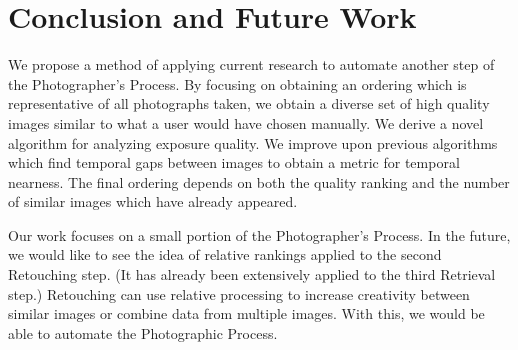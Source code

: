 \documentclass{article}
\begin{document}

\section{Conclusion and Future Work}
We propose a method of applying current research to automate another step of the Photographer's Process. By focusing on obtaining an ordering which is representative of all photographs taken, we obtain a diverse set of high quality images similar to what a user would have chosen manually. We derive a novel algorithm for analyzing exposure quality. We improve upon previous algorithms which find temporal gaps between images to obtain a metric for temporal nearness. The final ordering depends on both the quality ranking and the number of similar images which have already appeared.

Our work focuses on a small portion of the Photographer's Process. In the future, we would like to see the idea of relative rankings applied to the second Retouching step. (It has already been extensively applied to the third Retrieval step.) Retouching can use relative processing to increase creativity between similar images or combine data from multiple images. With this, we would be able to automate the Photographic Process.

{\footnotesize
 
 
}
\end{document}
